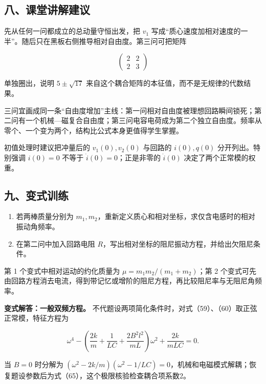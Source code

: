 \documentclass[12pt,a4paper,UTF8]{ctexart}
\newcommand{\tightlist}{\setlength{\itemsep}{0pt}\setlength{\parskip}{0pt}}
\begin{document}
\subsection{八、课堂讲解建议}\label{ux516bux8bfeux5802ux8bb2ux89e3ux5efaux8bae-4}

先从任何一问都成立的总动量守恒出发，把 \(v_1\)
写成``质心速度加相对速度的一半''。随后只在黑板右侧推导相对自由度。第三问可把矩阵

\[\begin{pmatrix}2&2\\2&3\end{pmatrix}\]

单独圈出，说明 \(5\pm\sqrt{17}\)
来自这个耦合矩阵的本征值，而不是无规律的代数结果。

三问宜画成同一条``自由度增加''主线：第一问相对自由度被理想回路瞬间锁死；第二问有一个机械---磁复合自由度；第三问电容电荷成为第二个独立自由度。频率从零个、一个变为两个，结构比公式本身更值得学生掌握。

初值处理时建议把冲量后的 \(v_1(0),v_2(0)\) 与回路的 \(i(0),q(0)\)
分开列出。特别强调 \(i(0)=0\) 不等于 \(\dot i(0)=0\)；正是非零的
\(\dot i(0)\) 决定了两个正常模的权重。

\subsection{九、变式训练}\label{ux4e5dux53d8ux5f0fux8badux7ec3-4}

\begin{enumerate}
\def\labelenumi{\arabic{enumi}.}
\tightlist
\item
  若两棒质量分别为
  \(m_1,m_2\)，重新定义质心和相对坐标，求仅含电感时的相对振动角频率。
\item
  在第二问中加入回路电阻
  \(R\)，写出相对坐标的阻尼振动方程，并给出欠阻尼条件。
\end{enumerate}

第 1 个变式中相对运动的约化质量为 \(\mu=m_1m_2/(m_1+m_2)\)；第 2
个变式可先由回路方程消去电流，得到带记忆或增阶的阻尼方程，再比较阻尼率与无阻尼角频率。

\textbf{变式解答：一般双频方程。}
不代题设两项简化条件时，对式（59）、（60）取正弦正常模，特征方程为

\[\omega^4-\left(\frac{2k}{m}+\frac1{LC}+\frac{2B^2l^2}{mL}\right)\omega^2+\frac{2k}{mLC}=0.\]

当 \(B=0\) 时分解为
\((\omega^2-2k/m)(\omega^2-1/LC)=0\)，机械和电磁模式解耦；恢复题设参数后为式（65），这个极限核验检查耦合项系数2。
\end{document}
